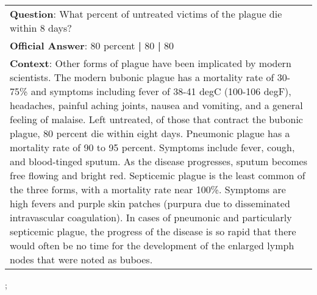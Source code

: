 \begin{figure*}[ht]
{\begin{tabular}{p{}}
            \textbf{Question}: What percent of untreated victims of the plague die within 8 days?                                                                                                                                                                                                                                                                                                                                                                                                                                                                                                                                                                                                                                                                                                                                                                                                                                                                                                                        \\
            \textbf{Official Answer}: 80 percent \textbf{|} 80 \textbf{|} 80                                                                                                                                                                                                                                                                                                                                                                                                                                                                                                                                                                                                                                                                                                                                                                                                                                                                                                                                             \\
            \textbf{Context}: Other forms of plague have been implicated by modern scientists. The modern bubonic plague has a mortality rate of 30-75\% and symptoms including fever of 38-41 degC (100-106 degF), headaches, painful aching joints, nausea and vomiting, and a general feeling of malaise. Left untreated, of those that contract the bubonic plague, 80 percent die within eight days. Pneumonic plague has a mortality rate of 90 to 95 percent. Symptoms include fever, cough, and blood-tinged sputum. As the disease progresses, sputum becomes free flowing and bright red. Septicemic plague is the least common of the three forms, with a mortality rate near 100\%. Symptoms are high fevers and purple skin patches (purpura due to disseminated intravascular coagulation). In cases of pneumonic and particularly septicemic plague, the progress of the disease is so rapid that there would often be no time for the development of the enlarged lymph nodes that were noted as buboes. \\
        \end{tabular}
    };
    \label{fig:ex-57264d58f1498d1400e8db7c}
\end{figure*}

